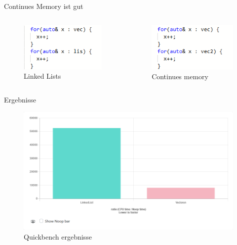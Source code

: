 \documentclass[11pt]{beamer}
\begin{document}
\begin{frame}{Continues Memory ist gut}
\begin{columns}
\begin{column}{0.5\textwidth}

\begin{figure}[hbtp]
\centering
\includegraphics[scale=.6]{list.png}
\caption{Linked Lists}
\end{figure}

\end{column}
\begin{column}{0.5\textwidth}

\begin{figure}[hbtp]
\centering
\includegraphics[scale=.6]{vec.png}
\caption{Continues memory}
\end{figure}

\end{column}
\end{columns}
\end{frame}

\begin{frame}{Ergebnisse}
\begin{figure}[hbtp]
\centering
\includegraphics[scale=.35]{benchmark.png}
\caption{Quickbench ergebnisse}
\end{figure}
\end{frame}
\end{document}

